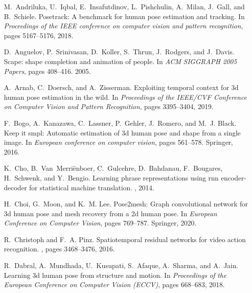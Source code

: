 \documentclass[10pt,twocolumn,letterpaper]{article}
\begin{document}
\clearpage
\begin{thebibliography}{10}\itemsep=-1pt

M.~Andriluka, U.~Iqbal, E.~Insafutdinov, L.~Pishchulin, A.~Milan, J.~Gall, and
  B.~Schiele.
\newblock Posetrack: A benchmark for human pose estimation and tracking.
\newblock In {\em Proceedings of the IEEE conference on computer vision and
  pattern recognition}, pages 5167--5176, 2018.

D.~Anguelov, P.~Srinivasan, D.~Koller, S.~Thrun, J.~Rodgers, and J.~Davis.
\newblock Scape: shape completion and animation of people.
\newblock In {\em ACM SIGGRAPH 2005 Papers}, pages 408--416. 2005.

A.~Arnab, C.~Doersch, and A.~Zisserman.
\newblock Exploiting temporal context for 3d human pose estimation in the wild.
\newblock In {\em Proceedings of the IEEE/CVF Conference on Computer Vision and
  Pattern Recognition}, pages 3395--3404, 2019.

F.~Bogo, A.~Kanazawa, C.~Lassner, P.~Gehler, J.~Romero, and M.~J. Black.
\newblock Keep it smpl: Automatic estimation of 3d human pose and shape from a
  single image.
\newblock In {\em European conference on computer vision}, pages 561--578.
  Springer, 2016.

K.~Cho, B.~Van~Merri{\"e}nboer, C.~Gulcehre, D.~Bahdanau, F.~Bougares,
  H.~Schwenk, and Y.~Bengio.
\newblock Learning phrase representations using rnn encoder-decoder for
  statistical machine translation.
, 2014.

H.~Choi, G.~Moon, and K.~M. Lee.
\newblock Pose2mesh: Graph convolutional network for 3d human pose and mesh
  recovery from a 2d human pose.
\newblock In {\em European Conference on Computer Vision}, pages 769--787.
  Springer, 2020.

R.~Christoph and F.~A. Pinz.
\newblock Spatiotemporal residual networks for video action recognition.
, pages
  3468--3476, 2016.

R.~Dabral, A.~Mundhada, U.~Kusupati, S.~Afaque, A.~Sharma, and A.~Jain.
\newblock Learning 3d human pose from structure and motion.
\newblock In {\em Proceedings of the European Conference on Computer Vision
  (ECCV)}, pages 668--683, 2018.


\end{thebibliography}
\end{document}
